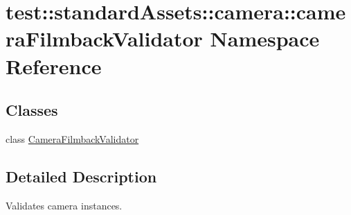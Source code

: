 \hypertarget{namespacetest_1_1standardAssets_1_1camera_1_1cameraFilmbackValidator}{\section{test\-:\-:standard\-Assets\-:\-:camera\-:\-:camera\-Filmback\-Validator \-Namespace \-Reference}
\label{d9/da8/namespacetest_1_1standardAssets_1_1camera_1_1cameraFilmbackValidator}
}
\subsection*{\-Classes}
\begin{DoxyCompactItemize}
\item 
class \hyperlink{classtest_1_1standardAssets_1_1camera_1_1cameraFilmbackValidator_1_1CameraFilmbackValidator}{\-Camera\-Filmback\-Validator}
\end{DoxyCompactItemize}


\subsection{\-Detailed \-Description}
\begin{DoxyVerb}
Validates camera instances.
\end{DoxyVerb}
 